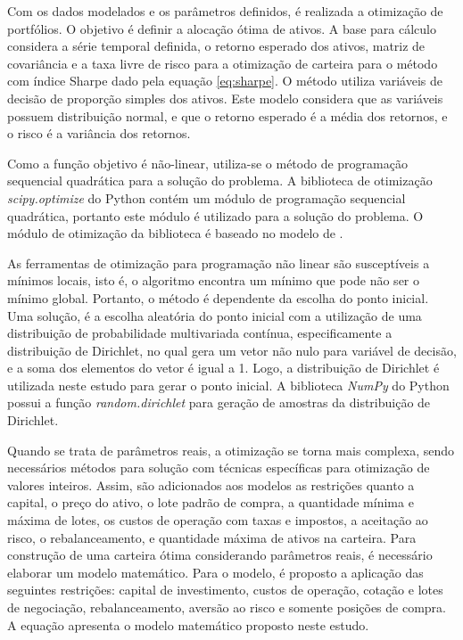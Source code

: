         \ipar Com os dados modelados e os parâmetros definidos, é realizada a otimização de portfólios. O objetivo é definir a alocação ótima de ativos. A base para cálculo considera a série temporal definida, o retorno esperado dos ativos, matriz de covariância e a taxa livre de risco para a otimização de carteira para o método com índice Sharpe dado pela equação \ref{eq:sharpe}. O método utiliza variáveis de decisão de proporção simples dos ativos. Este modelo considera que as variáveis possuem distribuição normal, e que o retorno esperado é a média dos retornos, e o risco é a variância dos retornos.
        
        \ipar Como a função objetivo é não-linear, utiliza-se o método de programação sequencial quadrática para a solução do problema. A biblioteca de otimização \textit{scipy.optimize} do Python contém um módulo de programação sequencial quadrática, portanto este módulo é utilizado para a solução do problema. O módulo de otimização da biblioteca é baseado no modelo de .
        
        \ipar As ferramentas de otimização para programação não linear são susceptíveis a mínimos locais, isto é, o algoritmo encontra um mínimo que pode não ser o mínimo global. Portanto, o método é dependente da escolha do ponto inicial. Uma solução, é a escolha aleatória do ponto inicial com a utilização de uma distribuição de probabilidade multivariada contínua, especificamente a distribuição de Dirichlet, no qual gera um vetor não nulo para variável de decisão, e a soma dos elementos do vetor é igual a 1. Logo, a distribuição de Dirichlet é utilizada neste estudo para gerar o ponto inicial. A biblioteca \textit{NumPy} do Python possui a função \textit{random.dirichlet} para geração de amostras da distribuição de Dirichlet.

        \ipar Quando se trata de parâmetros reais, a otimização se torna mais complexa, sendo necessários métodos para solução com técnicas específicas para otimização de valores inteiros. Assim, são adicionados aos modelos as restrições quanto a capital, o preço do ativo, o lote padrão de compra, a quantidade mínima e máxima de lotes, os custos de operação com taxas e impostos, a aceitação ao risco, o rebalanceamento, e quantidade máxima de ativos na carteira. Para construção de uma carteira ótima considerando parâmetros reais, é necessário elaborar um modelo matemático. Para o modelo, é proposto a aplicação das seguintes restrições: capital de investimento, custos de operação, cotação e lotes de negociação, rebalanceamento, aversão ao risco e somente posições de compra. A equação  apresenta o modelo matemático proposto neste estudo.


